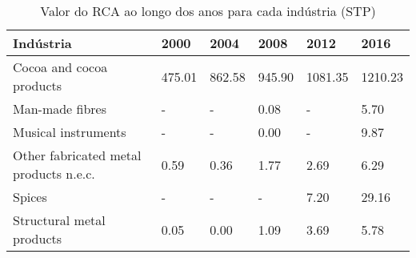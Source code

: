 \begin{table}
\centering
\caption{Valor do RCA ao longo dos anos para cada indústria (STP)}
\begin{tabular}{p{6cm}p{1.5cm}p{1.5cm}p{1.5cm}p{1.5cm}p{1.5cm}}
\toprule
                             Indústria &   2000 &   2004 &   2008 &    2012 &    2016 \\
\midrule
              Cocoa and cocoa products & 475.01 & 862.58 & 945.90 & 1081.35 & 1210.23 \\
                       Man-made fibres &      - &      - &   0.08 &       - &    5.70 \\
                   Musical instruments &      - &      - &   0.00 &       - &    9.87 \\
Other fabricated metal products n.e.c. &   0.59 &   0.36 &   1.77 &    2.69 &    6.29 \\
                                Spices &      - &      - &      - &    7.20 &   29.16 \\
             Structural metal products &   0.05 &   0.00 &   1.09 &    3.69 &    5.78 \\
\bottomrule
\end{tabular}
\end{table}
